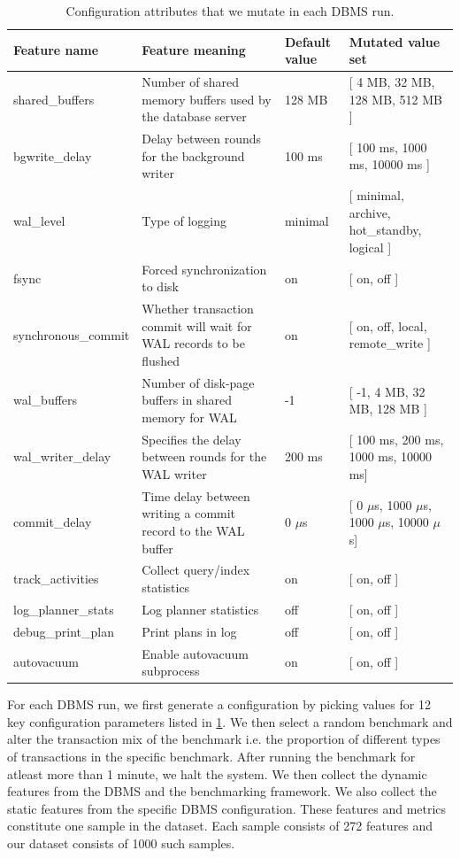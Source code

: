\begin{table}
\centering
  \begin{adjustbox}{max width=\textwidth}
  \begin{tabular}{l|lll} 
	\toprule
   		Feature name &  Feature meaning & Default value & Mutated value set \\
    \midrule
    	shared\_buffers & Number of shared memory buffers used by the database
    	server & 128 MB &  [ 4 MB, 32 MB, 128 MB, 512 MB ] \\
    	bgwrite\_delay &  Delay between rounds for the
    	background writer & 100 ms &  [ 100 ms, 1000 ms, 10000 ms ] \\
    	wal\_level & Type of logging & minimal &  [ minimal, archive, hot\_standby,
    	logical ] \\
    	fsync & Forced synchronization to disk & on &  [ on, off ] \\
    	synchronous\_commit & Whether transaction commit will wait for WAL records to be flushed & on &  [ on, off, local,
    	remote\_write ] \\
    	wal\_buffers & Number of disk-page buffers in shared memory for WAL & 
    	-1 &  [ -1, 4 MB, 32 MB, 128 MB ] \\
    	wal\_writer\_delay & Specifies the delay between rounds for the
    	WAL writer & 200 ms &  [ 100 ms, 200 ms, 1000 ms, 10000 ms] \\
    	commit\_delay & Time delay between writing a commit record to the WAL
    	buffer & 0 $\mu$s &  [ 0 $\mu$s, 1000 $\mu$s, 1000 $\mu$s, 10000 $\mu$s] \\
    	track\_activities & Collect query/index statistics  & on &  [ on, off ]	\\
    	log\_planner\_stats & Log planner statistics  & off &  [ on, off ] \\
    	debug\_print\_plan & Print plans in log  & off &  [ on, off ] \\
    	autovacuum & Enable autovacuum subprocess  & on &  [ on, off ] \\    	    	
   \bottomrule
   \end{tabular}
   \end{adjustbox}   
\caption{Configuration attributes that we mutate in each DBMS run.}
\label{tab:mutate}
\end{table}


For each DBMS run, we first generate a configuration by picking
values for 12 key configuration parameters listed in \cref{tab:mutate}.
We then select a random benchmark and alter the transaction mix of the
benchmark i.e. the proportion of different types of transactions in 
the specific benchmark. After running the benchmark for atleast more than
1 minute, we halt the system.  We then collect the dynamic features from the
DBMS and the benchmarking framework. We also collect the static features
from the specific DBMS configuration. These features and metrics constitute
one sample in the dataset.
Each sample consists of 272 features and our dataset consists of 1000
such samples.

